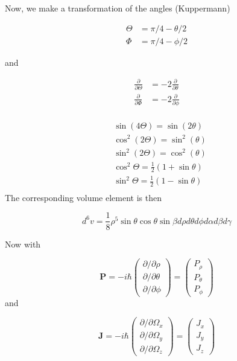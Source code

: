 \documentclass{article}
\numberwithin{equation}{section}
\numberwithin{figure}{section}
\begin{document}
Now, we make a transformation of the angles (Kuppermann)

\begin{align*}
\Theta &= \pi/4-\theta/2\\
\Phi &= \pi/4-\phi/2
\end{align*}

and

\begin{align*}
\frac{\partial}{\partial\Theta} &= -2\frac{\partial}{\partial\theta}\\ 						\frac{\partial}{\partial\Phi} &= -2\frac{\partial}{\partial\phi}\\ 		
\end{align*}

\begin{align*}
&\sin(4\Theta)   =\sin(2\theta)\\
&\cos^2(2\Theta) =\sin^2(\theta)\\
&\sin^2(2\Theta) =\cos^2(\theta)\\
&\cos^2\Theta    =\frac{1}{2}(1+\sin\theta)\\
&\sin^2\Theta    =\frac{1}{2}(1-\sin\theta)\\
\end{align*}
The corresponding volume element is then

\begin{equation}
d^6 v = \frac{1}{8}\rho^5 \sin\theta\cos\theta\sin\beta d\rho d\theta d\phi d\alpha d\beta d\gamma
\end{equation}

Now with

\begin{equation}
\mathbf{P} = 
-i\hbar
\begin{pmatrix}
\partial/\partial\rho\\
\partial/\partial\theta\\
\partial/\partial\phi
\end{pmatrix}
=
\begin{pmatrix}
P_{\rho}\\
P_{\theta}\\
P_{\phi}
\end{pmatrix}
\end{equation}
and

\begin{equation}
\mathbf{J} = 
-i\hbar
\begin{pmatrix}
\partial/\partial\Omega_x\\
\partial/\partial\Omega_y\\
\partial/\partial\Omega_z
\end{pmatrix}
=
\begin{pmatrix}
J_x\\
J_y\\
J_z
\end{pmatrix}
\end{equation}
\end{document}
